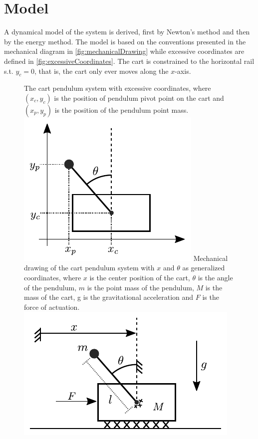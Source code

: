 \section{Model}
A dynamical model of the system is derived, first by Newton's method and then by the energy method. The model is based on the conventions presented in the mechanical diagram in \autoref{fig:mechanicalDrawing} while excessive coordinates are defined in \autoref{fig:excessiveCoordinates}. The cart is constrained to the horizontal rail s.t. $y_c = 0$, that is, the cart only ever moves along the $x$-axis.


\begin{figure}[H]
  \hspace{-10pt}
  \captionbox
  {
    The cart pendulum system with excessive coordinates, where $(x_c, y_c)$ is the position of pendulum pivot point on the cart and $(x_p, y_p)$ is the position of the pendulum point mass.
    \label{fig:excessiveCoordinates}
  }
  {
    \hspace{-1cm}
    \includegraphics[width=.4\textwidth]{figures/excessiveCoordinates}\vspace{-11pt}
  }
  \hspace{20pt}
  \captionbox 
  {
    Mechanical drawing of the cart pendulum system with $x$ and $\theta$ as generalized coordinates, where $x$ is the center position of the cart, $\theta$ is the angle of the pendulum, $m$ is the point mass of the pendulum, $M$ is the mass of the cart, g is the gravitational acceleration and $F$ is the force of actuation.
    \label{fig:mechanicalDrawing}
  }
  {
    \hspace{-1cm}
    \includegraphics[width=.5\textwidth]{figures/mechanicalDrawing}\vspace{6pt}
  }  
\end{figure}


